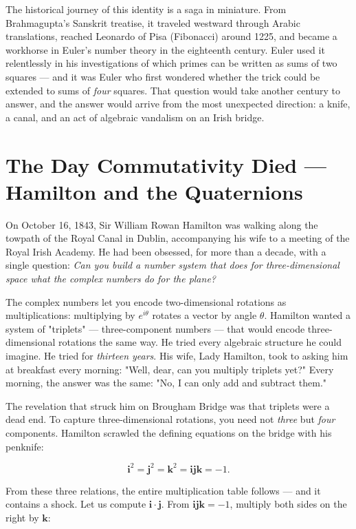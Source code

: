 The historical journey of this identity is a saga in miniature. From Brahmagupta's Sanskrit treatise, it traveled westward through Arabic translations, reached Leonardo of Pisa (Fibonacci) around 1225, and became a workhorse in Euler's number theory in the eighteenth century. Euler used it relentlessly in his investigations of which primes can be written as sums of two squares --- and it was Euler who first wondered whether the trick could be extended to sums of \textit{four} squares. That question would take another century to answer, and the answer would arrive from the most unexpected direction: a knife, a canal, and an act of algebraic vandalism on an Irish bridge.


\ornbreak



\section{The Day Commutativity Died --- Hamilton and the Quaternions}


On October 16, 1843, Sir William Rowan Hamilton was walking along the towpath of the Royal Canal in Dublin, accompanying his wife to a meeting of the Royal Irish Academy. He had been obsessed, for more than a decade, with a single question: \textit{Can you build a number system that does for three-dimensional space what the complex numbers do for the plane?}

The complex numbers let you encode two-dimensional rotations as multiplications: multiplying by $e^{i\theta}$ rotates a vector by angle $\theta$. Hamilton wanted a system of "triplets" --- three-component numbers --- that would encode three-dimensional rotations the same way. He tried every algebraic structure he could imagine. He tried for \textit{thirteen years}. His wife, Lady Hamilton, took to asking him at breakfast every morning: "Well, dear, can you multiply triplets yet?" Every morning, the answer was the same: "No, I can only add and subtract them."

The revelation that struck him on Brougham Bridge was that triplets were a dead end. To capture three-dimensional rotations, you need not \textit{three} but \textit{four} components. Hamilton scrawled the defining equations on the bridge with his penknife:

\[
\mathbf{i}^2 = \mathbf{j}^2 = \mathbf{k}^2 = \mathbf{i}\mathbf{j}\mathbf{k} = -1.
\]

From these three relations, the entire multiplication table follows --- and it contains a shock. Let us compute $\mathbf{i} \cdot \mathbf{j}$. From $\mathbf{i}\mathbf{j}\mathbf{k} = -1$, multiply both sides on the right by $\mathbf{k}$:

